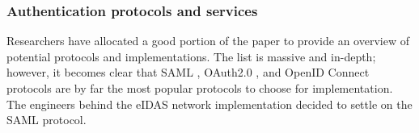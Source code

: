\subsubsection{Authentication protocols and services}

Researchers have allocated a good portion of the paper to provide an overview of potential protocols and implementations. The list is massive and in-depth; however, it becomes clear that SAML \cite{saml}, OAuth2.0 \cite{rfc6749}, and OpenID Connect \cite{oidc} protocols are by far the most popular protocols to choose for implementation. The engineers behind the eIDAS network implementation decided to settle on the SAML protocol.












